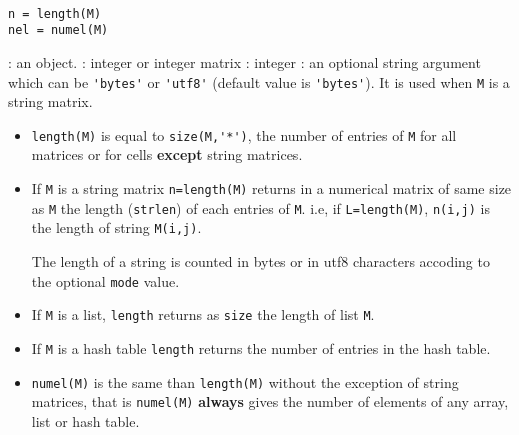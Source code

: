 \begin{mandesc}
   \\
\end{mandesc}
\begin{calling_sequence}
\begin{verbatim}
n = length(M)
nel = numel(M)
\end{verbatim}
\end{calling_sequence}

\begin{parameters}
  \begin{varlist}
    : an object.
    : integer or integer matrix
    : integer
    : an optional string argument which can be \verb!'bytes'! or \verb!'utf8'!
    (default value is \verb!'bytes'!). It is used when \verb!M! is a string matrix.
  \end{varlist}
\end{parameters}

\begin{mandescription}
\begin{itemize}
  \item \verb!length(M)! is equal to \verb!size(M,'*')!, the number of entries of \verb!M! for all matrices
    or for cells {\bf except} string matrices.
  \item If \verb+M+ is a string matrix \verb+n=length(M)+ returns in a  numerical matrix of same size
    as \verb+M+ the length (\verb+strlen+) of each entries of \verb+M+. i.e, if \verb+L=length(M)+,
    \verb+n(i,j)+ is the length of string \verb+M(i,j)+.

    The length of a string is counted in bytes or in utf8 characters accoding
    to the optional \verb!mode! value.

  \item If \verb+M+ is a list, \verb+length+ returns as \verb+size+ the length of list \verb+M+.
  \item If \verb+M+ is a hash table \verb+length+ returns the number of entries in the hash table.
  \item \verb!numel(M)! is the same than \verb!length(M)! without the exception of string matrices, that
        is \verb!numel(M)! {\bf always} gives the number of elements of any array, list or hash table.
\end{itemize}
\end{mandescription}

